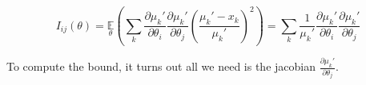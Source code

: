 \begin{equation*}
I_{ij}(\theta) = \underset{\theta}{\mathbb{E}}\left(\sum_{k}\frac{\partial \mu_{k}'}{\partial\theta_{i}}\frac{\partial \mu_{k}'}{\partial\theta_{j}} \left(\frac{\mu_{k}'-x_{k}}{\mu_{k}'}\right)^{2}\right) = \sum_{k}\frac{1}{\mu_{k}'}\frac{\partial \mu_{k}'}{\partial\theta_{i}}\frac{\partial \mu_{k}'}{\partial\theta_{j}}
\end{equation*}

To compute the bound, it turns out all we need is the jacobian $\frac{\partial \mu_{k}'}{\partial\theta_{j}} $.


